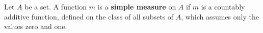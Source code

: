 Let $A$ be a set. A function $m$ is a \textbf{simple measure} on $A$ if $m$ is a countably additive function, defined on the class of all subsets of $A$, which assumes only the values zero and one.

